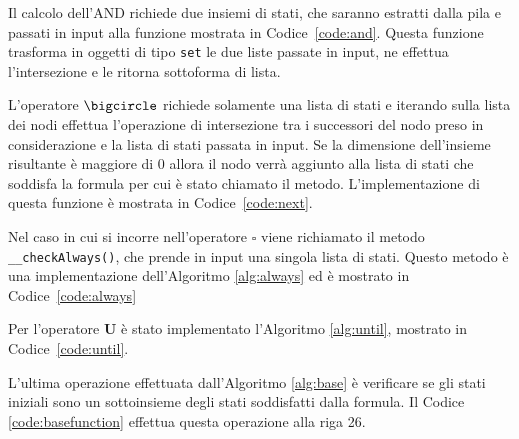 \documentclass[a4paper, 10pt]{article}
\numberwithin{equation}{theor}
\begin{document}
Il calcolo dell'AND richiede due insiemi di stati, che saranno estratti dalla pila e passati in input alla funzione mostrata in Codice~\ref{code:and}. Questa funzione trasforma in oggetti di tipo \texttt{set} le due liste passate in input, ne effettua l'intersezione e le ritorna sottoforma di lista.

L'operatore $\bigcircle$ richiede solamente una lista di stati e iterando sulla lista dei nodi effettua l'operazione di intersezione tra i successori del nodo preso in considerazione e la lista di stati passata in input. Se la dimensione dell'insieme risultante è maggiore di 0 allora il nodo verrà aggiunto alla lista di stati che soddisfa la formula per cui è stato chiamato il metodo. L'implementazione di questa funzione è mostrata in Codice~\ref{code:next}.


Nel caso in cui si incorre nell'operatore $\square$ viene richiamato il metodo \texttt{__checkAlways()}, che prende in input una singola lista di stati. Questo metodo è una implementazione dell'Algoritmo \ref{alg:always} ed è mostrato in Codice~\ref{code:always}

Per l'operatore $\boldsymbol{U}$ è stato implementato l'Algoritmo \ref{alg:until}, mostrato in Codice~\ref{code:until}.

L'ultima operazione effettuata dall'Algoritmo \ref{alg:base} è verificare se gli stati iniziali sono un sottoinsieme degli stati soddisfatti dalla formula. Il Codice \ref{code:basefunction} effettua questa operazione alla riga 26.
\end{document}
